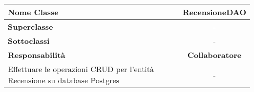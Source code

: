
\setcounter{table}{0}
\begin{table}[H]
    \centering
    \begin{tabularx}{\textwidth}{||   X  ||  c   ||}
        \rowcolor{Gray}
        \hline
        \textbf{Nome Classe} & RecensioneDAO\\
        \hline
        \textbf{Superclasse}  &  - \\
        \hline
        \textbf{Sottoclassi} & - \\
        \hline
        \hline
         \textbf{Responsabilità} & \textbf{Collaboratore} \\
         \hline
          Effettuare le operazioni \gls{CRUD} per l'entità Recensione su database Postgres & - \\
         \hline
    \end{tabularx}
\end{table}

    
       
